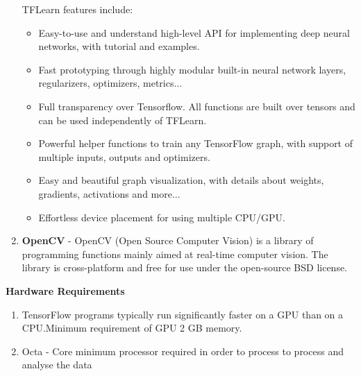 \begin{enumerate}
	TFLearn features include:
	\begin{itemize}
		\item Easy-to-use and understand high-level API for implementing deep neural networks, with tutorial and examples.
		\item Fast prototyping through highly modular built-in neural network layers, regularizers, optimizers, metrics...
		\item Full transparency over Tensorflow. All functions are built over tensors and can be used independently of TFLearn.
		\item Powerful helper functions to train any TensorFlow graph, with support of multiple inputs, outputs and optimizers.
		\item Easy and beautiful graph visualization, with details about weights, gradients, activations and more...
		\item Effortless device placement for using multiple CPU/GPU.
		
	\end{itemize}

	\item \textbf{OpenCV} - OpenCV (Open Source Computer Vision) is a library of programming functions mainly aimed at real-time computer vision. The library is cross-platform and free for use under the open-source BSD license.
	
\end{enumerate}
\newpage
\begin{flushleft}
	\textbf{Hardware Requirements}
\end{flushleft}
\begin{enumerate}
	\item TensorFlow programs typically run significantly faster on a GPU than on a CPU.Minimum requirement of GPU 2 GB memory.
	
	\item Octa - Core minimum processor required in order to process to process and analyse the data 
\end{enumerate}